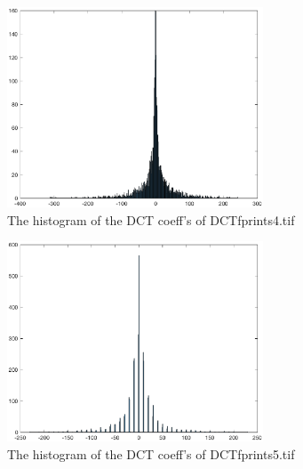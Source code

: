 \documentclass{article}
\begin{document}
\begin{figure}[H]
\centering
\includegraphics [width=3in]{lab5_04.eps}
\caption{The histogram of the DCT coeff's of DCTfprints4.tif}
\label{DCT4}
\end{figure}

\begin{figure}[H]
\centering
\includegraphics [width=3in]{lab5_05.eps}
\caption{The histogram of the DCT coeff's of DCTfprints5.tif}
\label{DCT5}
\end{figure}
\end{document}
